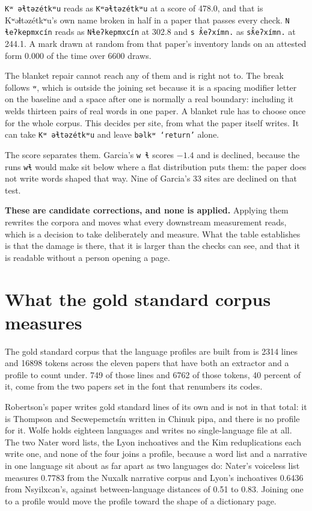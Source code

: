 \texttt{Kʷ əɬtəzétkʷu} reads as \texttt{Kʷəɬtəzétkʷu} at a score of 478.0, and that is Kʷəɬtəzétkʷu's own name broken in half in a paper that passes every check. \texttt{N ɬeʔkepmxcín} reads as \texttt{Nɬeʔkepmxcín} at 302.8 and \texttt{s ƛ̓eʔxímn.} as \texttt{sƛ̓eʔxímn.} at 244.1. A mark drawn at random from that paper's inventory lands on an attested form 0.000 of the time over 6600 draws.

The blanket repair cannot reach any of them and is right not to. The break follows \texttt{ʷ}, which is outside the joining set because it is a spacing modifier letter on the baseline and a space after one is normally a real boundary: including it welds thirteen pairs of real words in one paper. A blanket rule has to choose once for the whole corpus. This decides per site, from what the paper itself writes. It can take \texttt{Kʷ əɬtəzétkʷu} and leave \texttt{bəlkʷ `return'} alone.

The score separates them. Garcia's \texttt{w ɬ} scores $-1.4$ and is declined, because the runs \texttt{wɬ} would make sit below where a flat distribution puts them: the paper does not write words shaped that way. Nine of Garcia's 33 sites are declined on that test.

\textbf{These are candidate corrections, and none is applied.} Applying them rewrites the corpora and moves what every downstream measurement reads, which is a decision to take deliberately and measure. What the table establishes is that the damage is there, that it is larger than the checks can see, and that it is readable without a person opening a page.

\section{What the gold standard corpus measures}

The gold standard corpus that the language profiles are built from is 2314 lines and 16898 tokens across the eleven papers that have both an extractor and a profile to count under. 749 of those lines and 6762 of those tokens, 40 percent of it, come from the two papers set in the font that renumbers its codes.

Robertson's paper writes gold standard lines of its own and is not in that total: it is Thompson and Secwepemctsín written in Chinuk pipa, and there is no profile for it. Wolfe holds eighteen languages and writes no single-language file at all. The two Nater word lists, the Lyon inchoatives and the Kim reduplications each write one, and none of the four joins a profile, because a word list and a narrative in one language sit about as far apart as two languages do: Nater's voiceless list measures 0.7783 from the Nuxalk narrative corpus and Lyon's inchoatives 0.6436 from Nsyilxcən's, against between-language distances of 0.51 to 0.83. Joining one to a profile would move the profile toward the shape of a dictionary page.

